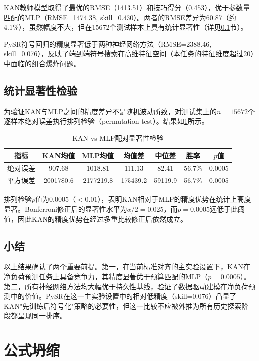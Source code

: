KAN教师模型取得了最优的RMSE（1413.51）和技巧得分（0.453），优于参数量匹配的MLP（RMSE=1474.38, skill=0.430）。两者的RMSE差异为60.87（约4.1\%），虽然幅度不大，但在15672个测试样本上具有统计显著性（详见\ref{subsec:significance}节）。

PySR符号回归的精度显著低于两种神经网络方法（RMSE=2388.46, skill=0.076），反映了端到端符号搜索在高维特征空间（本任务的特征维度超过20）中面临的组合爆炸问题。

\subsection{统计显著性检验}
\label{subsec:significance}

为验证KAN与MLP之间的精度差异不是随机波动所致，对测试集上的$n=15672$个逐样本绝对误差执行排列检验（permutation test）。结果如\cref{tab:significance}所示。

\begin{table}[htbp]
\centering
\caption{KAN vs MLP配对显著性检验}
\label{tab:significance}
\begin{tabular}{ccccccc}
\toprule
指标 & KAN均值 & MLP均值 & 均值差 & 中位差 & 胜率 & $p$值 \\
\midrule
绝对误差 & 907.68 & 1018.81 & 111.13 & 82.41 & 56.7\% & 0.0005 \\
平方误差 & 2001780.6 & 2177219.8 & 175439.2 & 59119.9 & 56.7\% & 0.0005 \\
\bottomrule
\end{tabular}
\end{table}

排列检验$p$值为0.0005（$< 0.01$），表明KAN相对于MLP的精度优势在统计上高度显著。Bonferroni修正后的显著性水平为$\alpha/2 = 0.025$，而$p=0.0005$远低于此阈值，因此KAN的精度优势在经过多重比较修正后依然成立。

\subsection{小结}

以上结果确认了两个重要前提。第一，在当前标准对齐的主实验设置下，KAN在净负荷预测任务上具备竞争力，其精度显著优于预算匹配的MLP（$p=0.0005$）。第二，所有神经网络方法均大幅优于持久性基线，验证了数据驱动建模在净负荷预测中的价值。PySR在这一主实验设置中的相对低精度（skill=0.076）凸显了KAN"先训练后符号化"策略的必要性，但这一比较不应被外推为所有历史探索阶段都呈现同一排序。

\section{公式坍缩}


